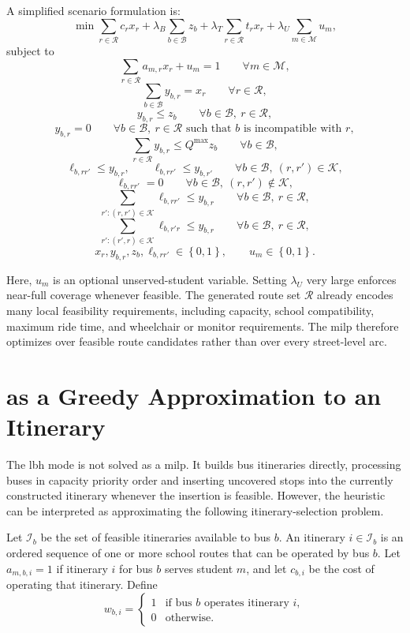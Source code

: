 A simplified scenario formulation is:
\[
\min
\sum_{r\in\mathcal{R}} c_r x_r
+ \lambda_B \sum_{b\in\mathcal{B}} z_b
+ \lambda_T \sum_{r\in\mathcal{R}} t_r x_r
+ \lambda_U \sum_{m\in\mathcal{M}} u_m ,
\]
subject to
\[
\sum_{r\in\mathcal{R}} a_{m,r}x_r + u_m = 1
\qquad \forall m\in\mathcal{M},
\]
\[
\sum_{b\in\mathcal{B}} y_{b,r} = x_r
\qquad \forall r\in\mathcal{R},
\]
\[
y_{b,r} \le z_b
\qquad \forall b\in\mathcal{B},\ r\in\mathcal{R},
\]
\[
y_{b,r} = 0
\qquad \forall b\in\mathcal{B},\ r\in\mathcal{R} \text{ such that } b \text{ is incompatible with } r,
\]
\[
\sum_{r\in\mathcal{R}} y_{b,r} \le Q^{\max} z_b
\qquad \forall b\in\mathcal{B},
\]
\[
\ell_{b,rr'} \le y_{b,r},
\qquad
\ell_{b,rr'} \le y_{b,r'}
\qquad \forall b\in\mathcal{B},\ \left(r,r'\right)\in\mathcal{K},
\]
\[
\ell_{b,rr'} = 0
\qquad \forall b\in\mathcal{B},\ \left(r,r'\right)\notin\mathcal{K},
\]
\[
\sum_{r':\left(r,r'\right)\in\mathcal{K}} \ell_{b,rr'} \le y_{b,r}
\qquad \forall b\in\mathcal{B},\ r\in\mathcal{R},
\]
\[
\sum_{r':\left(r',r\right)\in\mathcal{K}} \ell_{b,r'r} \le y_{b,r}
\qquad \forall b\in\mathcal{B},\ r\in\mathcal{R},
\]
\[
x_r,y_{b,r},z_b,\ell_{b,rr'}\in\left\{0,1\right\},
\qquad
u_m\in\left\{0,1\right\}.
\]

Here, $u_m$ is an optional unserved-student variable. Setting $\lambda_U$ very large enforces near-full coverage whenever feasible. The generated route set $\mathcal{R}$ already encodes many local feasibility requirements, including capacity, school compatibility, maximum ride time, and wheelchair or monitor requirements. The \gls{milp} therefore optimizes over feasible route candidates rather than over every street-level arc.

\section{ as a Greedy Approximation to an Itinerary }

The \gls{lbh} mode is not solved as a \gls{milp}. It builds bus itineraries directly, processing buses in capacity priority order and inserting uncovered stops into the currently constructed itinerary whenever the insertion is feasible. However, the heuristic can be interpreted as approximating the following itinerary-selection problem.

Let $\mathcal{I}_b$ be the set of feasible itineraries available to bus $b$. An itinerary $i\in\mathcal{I}_b$ is an ordered sequence of one or more school routes that can be operated by bus $b$. Let $a_{m,b,i}=1$ if itinerary $i$ for bus $b$ serves student $m$, and let $c_{b,i}$ be the cost of operating that itinerary. Define
\[
w_{b,i} =
\begin{cases}
1 & \text{if bus } b \text{ operates itinerary } i,\\
0 & \text{otherwise.}
\end{cases}
\]

